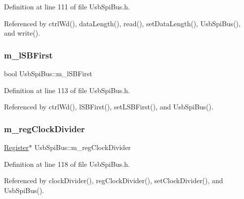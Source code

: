Definition at line 111 of file Usb\+Spi\+Bus.\+h.



Referenced by ctrl\+Wd(), data\+Length(), read(), set\+Data\+Length(), Usb\+Spi\+Bus(), and write().

\mbox{\label{classUsbSpiBus_a23011787b0425356b011bc7a1c7cff5b}} 
\subsubsection{\texorpdfstring{m\+\_\+l\+S\+B\+First}{m\_lSBFirst}}
{\footnotesize\ttfamily bool Usb\+Spi\+Bus\+::m\+\_\+l\+S\+B\+First\hspace{0.3cm}{\ttfamily [private]}}



Definition at line 113 of file Usb\+Spi\+Bus.\+h.



Referenced by ctrl\+Wd(), l\+S\+B\+First(), set\+L\+S\+B\+First(), and Usb\+Spi\+Bus().

\mbox{\label{classUsbSpiBus_abfd5f040a0a8c19d972b26ea581bf1f0}} 
\subsubsection{\texorpdfstring{m\+\_\+reg\+Clock\+Divider}{m\_regClockDivider}}
{\footnotesize\ttfamily \hyperlink{classRegister}{Register}$\ast$ Usb\+Spi\+Bus\+::m\+\_\+reg\+Clock\+Divider\hspace{0.3cm}{\ttfamily [private]}}



Definition at line 118 of file Usb\+Spi\+Bus.\+h.



Referenced by clock\+Divider(), reg\+Clock\+Divider(), set\+Clock\+Divider(), and Usb\+Spi\+Bus().

\mbox{\label{classUsbSpiBus_abcd2ac59f2bb4ea5b97ff98f2b7659da}} 
